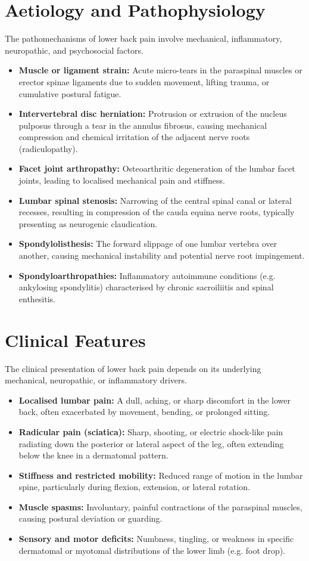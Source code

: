 \section*{Aetiology and Pathophysiology}
The pathomechanisms of lower back pain involve mechanical, inflammatory, neuropathic, and psychosocial factors.
\begin{itemize}
    \item \textbf{Muscle or ligament strain:} Acute micro-tears in the paraspinal muscles or erector spinae ligaments due to sudden movement, lifting trauma, or cumulative postural fatigue.
    \item \textbf{Intervertebral disc herniation:} Protrusion or extrusion of the nucleus pulposus through a tear in the annulus fibrosus, causing mechanical compression and chemical irritation of the adjacent nerve roots (radiculopathy).
    \item \textbf{Facet joint arthropathy:} Osteoarthritic degeneration of the lumbar facet joints, leading to localised mechanical pain and stiffness.
    \item \textbf{Lumbar spinal stenosis:} Narrowing of the central spinal canal or lateral recesses, resulting in compression of the cauda equina nerve roots, typically presenting as neurogenic claudication.
    \item \textbf{Spondylolisthesis:} The forward slippage of one lumbar vertebra over another, causing mechanical instability and potential nerve root impingement.
    \item \textbf{Spondyloarthropathies:} Inflammatory autoimmune conditions (e.g. ankylosing spondylitis) characterised by chronic sacroiliitis and spinal enthesitis.
\end{itemize}

\section*{Clinical Features}
The clinical presentation of lower back pain depends on its underlying mechanical, neuropathic, or inflammatory drivers.
\begin{itemize}
    \item \textbf{Localised lumbar pain:} A dull, aching, or sharp discomfort in the lower back, often exacerbated by movement, bending, or prolonged sitting.
    \item \textbf{Radicular pain (sciatica):} Sharp, shooting, or electric shock-like pain radiating down the posterior or lateral aspect of the leg, often extending below the knee in a dermatomal pattern.
    \item \textbf{Stiffness and restricted mobility:} Reduced range of motion in the lumbar spine, particularly during flexion, extension, or lateral rotation.
    \item \textbf{Muscle spasms:} Involuntary, painful contractions of the paraspinal muscles, causing postural deviation or guarding.
    \item \textbf{Sensory and motor deficits:} Numbness, tingling, or weakness in specific dermatomal or myotomal distributions of the lower limb (e.g. foot drop).
\end{itemize}

